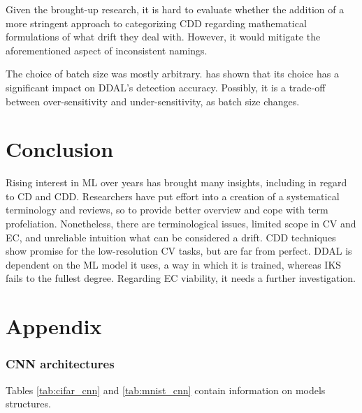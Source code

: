 \documentclass[a4paper]{article}
\begin{document}
Given the brought-up research, it is hard to evaluate whether the addition of a more stringent approach to categorizing CDD regarding mathematical formulations of what drift they deal with. However, it would mitigate the aforementioned aspect of inconsistent namings.

The choice of batch size was mostly arbitrary. \cite{baena-garcia_early_2006} has shown that its choice has a significant impact on DDAL's detection accuracy. Possibly, it is a trade-off between over-sensitivity and under-sensitivity, as batch size changes.

\section{Conclusion}
\label{sub:Conclusion}

Rising interest in ML over years has brought many insights, including in regard to CD and CDD. Researchers have put effort into a creation of a systematical terminology and reviews, so to provide better overview and cope with term profeliation. Nonetheless, there are terminological issues, limited scope in CV and EC, and unreliable intuition what can be considered a drift. CDD techniques show promise for the low-resolution CV tasks, but are far from perfect. DDAL is dependent on the ML model it uses, a way in which it is trained, whereas IKS fails to the fullest degree. Regarding EC viability, it needs a further investigation. 

\newpage
\printbibliography

\newpage
\section{Appendix} %
\label{sec:appendix}

\subsubsection{CNN architectures}

Tables \ref{tab:cifar_cnn} and \ref{tab:mnist_cnn} contain information on models structures. 
\end{document}
